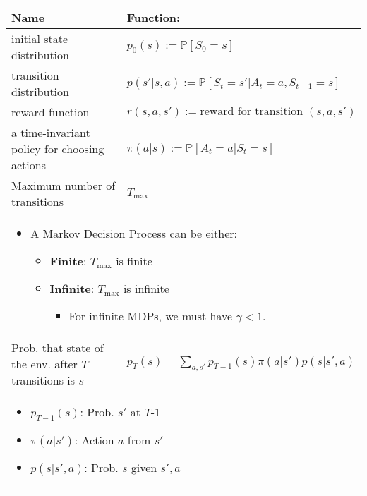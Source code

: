 \begin{summary}
    \begin{center}
        \begin{tabular}{ll}
            \toprule
            \textbf{Name} & \textbf{Function:} \\
            \midrule
            initial state distribution & $p_0(s) := \mathbb{P}[S_0 = s]$ \\
            \midrule
            transition distribution & $p(s'|s, a) := \mathbb{P}[S_t = s' | A_t = a, S_{t-1} = s]$ \\
            \midrule
            reward function & $r(s, a, s') := \text{reward for transition } (s, a, s')$ \\
            \midrule
            a time-invariant policy for choosing actions & $\pi(a|s) := \mathbb{P}[A_t = a | S_t = s]$ \\
            \midrule
            Maximum number of transitions & $T_{\max}$ \\
            \multicolumn{2}{p{\linewidth}}{
            \begin{itemize}
                \item A Markov Decision Process can be either:
                \begin{itemize}
                    \item \textbf{Finite}: $T_{\max}$ is finite
                    \item \textbf{Infinite}: $T_{\max}$ is infinite
                    \begin{itemize}
                        \item For infinite MDPs, we must have $\gamma < 1$.
                    \end{itemize}
                \end{itemize}
            \end{itemize}} \\
            \midrule
            Prob. that state of the env. after $T$ transitions is $s$ & $p_T(s) = \sum_{a,s'} p_{T-1}(s) \pi(a|s') p(s|s',a)$ \\
            \multicolumn{2}{p{\linewidth}}{
            \begin{itemize}
                \item $p_{T-1}(s)$: Prob. $s'$ at $T$-$1$
                \item $\pi(a|s')$: Action $a$ from $s'$
                \item $p(s|s',a)$: Prob. $s$ given $s',a$
            \end{itemize}} \\

\end{tabular}
\end{center}
\end{summary}
